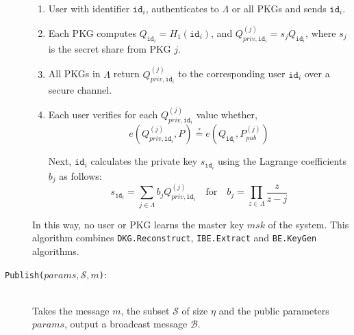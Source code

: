 \documentclass[journal]{IEEEtran}
\newcommand{\id}[1]{\ensuremath{\mathtt{id}_{#1}}}
\begin{document}
\begin{description}
    \begin{enumerate}
        \item User with identifier \id{i}, authenticates to $\Lambda$ or all PKGs and sends \id{i}.
        \item Each PKG computes $Q_{\id{i}} = H_1 \left( \id{i} \right)$, and $Q_{priv,\id{i}}^{(j)} = s_j Q_{\id{i}}$, where $s_j$ is the secret share from PKG $j$.
        \item All PKGs in $\Lambda$ return $Q_{priv,\id{i}}^{(j)}$ to the corresponding user $\id{i}$ over a secure channel.
        \item Each user verifies for each $Q_{priv,\id{i}}^{(j)}$ value whether, 
        \begin{equation*}
            e \left( Q_{priv , \id{i} }^{(j)}, P \right ) \stackrel{?}{=} e \left( Q_{\id{i}}, P_{pub}^{(j)} \right)
        \end{equation*}
        
        Next, $\id{i}$ calculates the private key $s_{\id{i}}$ using the Lagrange coefficients $b_j$ as follows: 
        \begin{equation*}
            s_{\id{i}} = \sum\limits_{j\in\Lambda} b_j Q_{priv,\id{i}}^{(j)} \quad \textrm{for} \quad b_j = \prod_{z\in \Lambda} \frac{z}{z-j}
        \end{equation*}
        \end{enumerate}
        In this way, no user or PKG learns the master key $msk$ of the system. This algorithm combines \texttt{DKG.Reconstruct}, \texttt{IBE.Extract} and \texttt{BE.KeyGen} algorithms.
        \bigskip
\item[\texttt{Publish($params, \mathcal{S}, m$)}:]~\\ Takes the message $m$, the subset $\mathcal{S}$ of size $\eta$ and the public parameters $params$, output a broadcast message $\mathcal{B}$.


\end{description}
\end{document}

